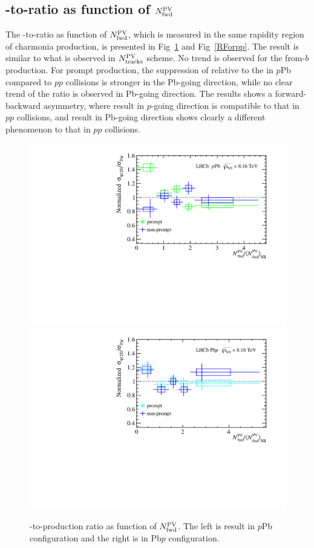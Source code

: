 \subsection{\psitwos-to-\jpsi ratio as function of $N^{\rm PV}_{\rm fwd}$}
The \psitwos-to-\jpsi ratio as function of $N^{\rm PV}_{\rm fwd}$, which is measured in the same rapidity region of charmonia production, is presented in Fig~\ref{RFor} and Fig~\ref{RForpp}. The result is similar to what is observed in $N^{\rm PV}_{\rm tracks}$ scheme. No trend is observed for the from-$b$ production. For prompt production, the suppression of \psitwos relative to the \jpsi in $p$Pb compared to $pp$ collisions is stronger in the Pb-going direction, while no clear trend of the ratio is observed in Pb-going direction. The results shows a forward-backward asymmetry, where result in $p$-going direction is compatible to that in $pp$ collisions, and result in Pb-going direction shows clearly a different phenomenon to that in $pp$ collisions.
\begin{figure}[H]
  \begin{center}
    \includegraphics[width=0.49\linewidth]{pdf/pPb/FWorkdir/Result/All.pdf}
    \includegraphics[width=0.49\linewidth]{pdf/Pbp/FWorkdir/Result/All.pdf}
    \vspace*{-0.5cm}
  \end{center}
  \caption{\psitwos-to-\jpsi production ratio as function of $N^{\rm PV}_{\rm fwd}$. The left is result in $p$Pb configuration and the right is in Pb$p$ configuration.
    }
  \label{RFor}
\end{figure}

